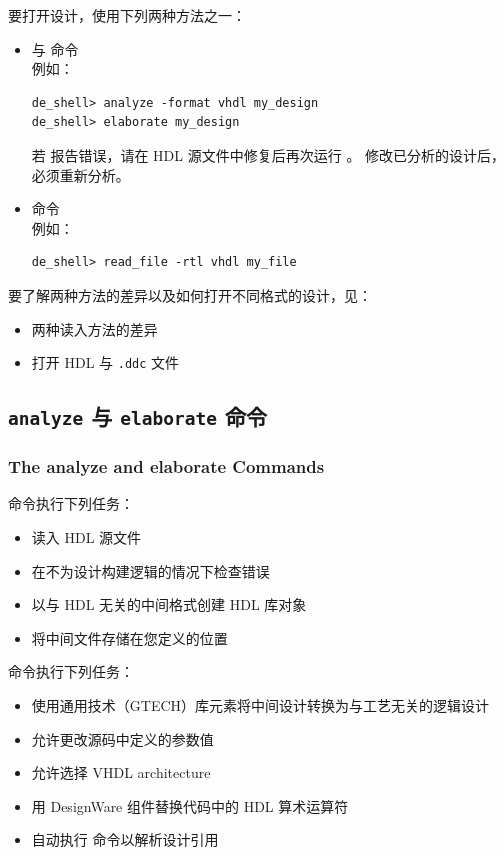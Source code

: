 要打开设计，使用下列两种方法之一：
\begin{itemize}
  \item {} 与  命令\\
        例如：
\begin{lstlisting}
de_shell> analyze -format vhdl my_design
de_shell> elaborate my_design
\end{lstlisting}
        若  报告错误，请在 HDL 源文件中修复后再次运行 。
        修改已分析的设计后，必须重新分析。
  \item {} 命令\\
        例如：
\begin{lstlisting}
de_shell> read_file -rtl vhdl my_file
\end{lstlisting}
\end{itemize}

要了解两种方法的差异以及如何打开不同格式的设计，见：
\begin{itemize}
  \item 两种读入方法的差异
  \item 打开 HDL 与 \texttt{.ddc} 文件
\end{itemize}

\subsection{\texttt{analyze} 与 \texttt{elaborate} 命令}
\subsubsection*{The analyze and elaborate Commands}

 命令执行下列任务：
\begin{itemize}
  \item 读入 HDL 源文件
  \item 在不为设计构建逻辑的情况下检查错误
  \item 以与 HDL 无关的中间格式创建 HDL 库对象
  \item 将中间文件存储在您定义的位置
\end{itemize}

 命令执行下列任务：
\begin{itemize}
  \item 使用通用技术（GTECH）库元素将中间设计转换为与工艺无关的逻辑设计
  \item 允许更改源码中定义的参数值
  \item 允许选择 VHDL architecture
  \item 用 DesignWare 组件替换代码中的 HDL 算术运算符
  \item 自动执行  命令以解析设计引用
\end{itemize}

